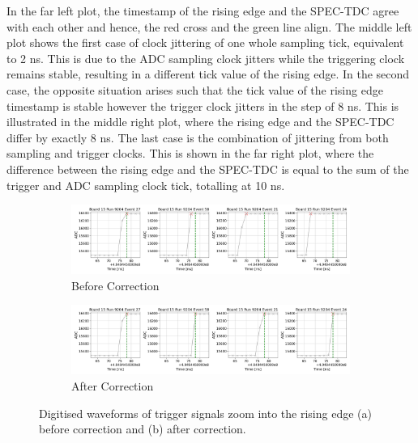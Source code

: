 In the far left plot, the timestamp of the rising edge and the SPEC-TDC agree with each other and hence, the red cross and the green line align.
The middle left plot shows the first case of clock jittering of one whole sampling tick, equivalent to 2 ns.
This is due to the ADC sampling clock jitters while the triggering clock remains stable, resulting in a different tick value of the rising edge.
In the second case, the opposite situation arises such that the tick value of the rising edge timestamp is stable however the trigger clock jitters in the step of 8 ns.
This is illustrated in the middle right plot, where the rising edge and the SPEC-TDC differ by exactly 8 ns. 
The last case is the combination of jittering from both sampling and trigger clocks.
This is shown in the far right plot, where the difference between the rising edge and the SPEC-TDC is equal to the sum of the trigger and ADC sampling clock tick, totalling at 10 ns.

\begin{figure}[t!]
\begin{subfigure}[h]{1.00\linewidth}
\centering    
\includegraphics[width=\linewidth]{jitter_before}
\caption{Before Correction}
\label{subfig:jitter_before}
\end{subfigure}
\vspace{0.5cm}
\begin{subfigure}[h]{1.00\linewidth}
\centering    
\includegraphics[width=\linewidth]{jitter_after}
\caption{After Correction}
\label{subfig:jitter_after}
\end{subfigure}%

\caption[Clock Jittering Correction Performed on Trigger Waveforms]{
Digitised waveforms of trigger signals zoom into the rising edge (a) before correction and (b) after correction.
}
\label{fig:jitterCorr}
\end{figure}

